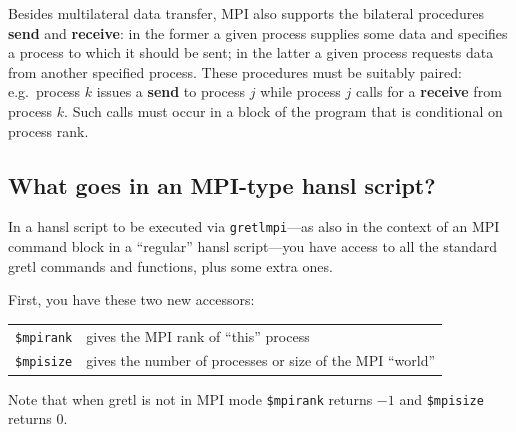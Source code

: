 \documentclass{article}
\begin{document}
Besides multilateral data transfer, MPI also supports the bilateral
procedures \textbf{send} and \textbf{receive}: in the former a given
process supplies some data and specifies a process to which it should
be sent; in the latter a given process requests data from another
specified process. These procedures must be suitably paired: e.g.\
process $k$ issues a \textbf{send} to process $j$ while process $j$
calls for a \textbf{receive} from process $k$. Such calls must occur
in a block of the program that is conditional on process rank.


\subsection{What goes in an MPI-type hansl script?}
\label{subsec:script}

In a hansl script to be executed via \texttt{gretlmpi}---as also
in the context of an MPI command block in a ``regular'' hansl
script---you have access to all the standard gretl commands and
functions, plus some extra ones.

First, you have these two new accessors:
\begin{center}
\begin{tabular}{ll}
\texttt{\$mpirank} & gives the MPI rank of ``this'' process \\
\texttt{\$mpisize} & gives the number of processes or size of the MPI ``world''
\end{tabular}
\end{center}

Note that when gretl is not in MPI mode \texttt{\$mpirank} returns
$-1$ and \texttt{\$mpisize} returns 0.
\end{document}
